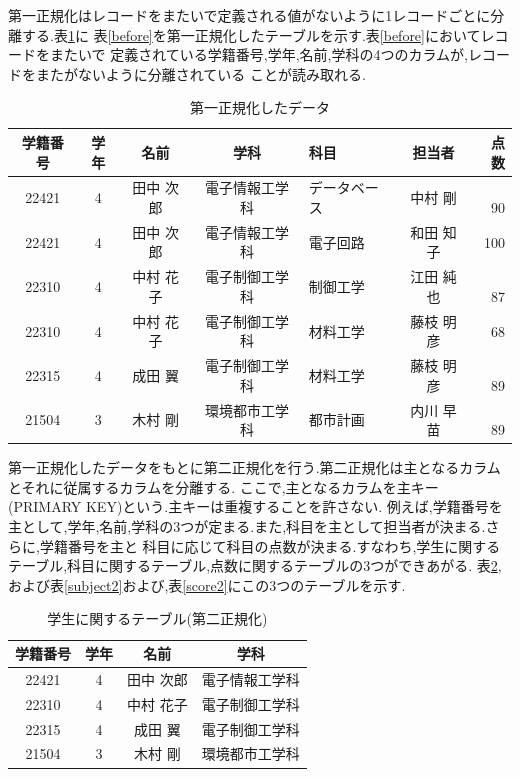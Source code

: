 \documentclass[a4j]{jarticle}
\begin{document}
        第一正規化はレコードをまたいで定義される値がないように1レコードごとに分離する.表\ref{one}に
        表\ref{before}を第一正規化したテーブルを示す.表\ref{before}においてレコードをまたいで
        定義されている学籍番号,学年,名前,学科の4つのカラムが,レコードをまたがないように分離されている
        ことが読み取れる.
        \begin{table}[H]
          \caption{第一正規化したデータ}
          \label{one}
          \begin{center}
            \begin{tabular}{c|c|c|c|l|c|r}\hline
              学籍番号 & 学年 & 名前 & 学科 & 科目 & 担当者 & 点数  \\ \hline \hline
              22421 & 4 & 田中 次郎 & 電子情報工学科 & データベース & 中村 剛 &　90  \\ \hline
              22421 & 4 & 田中 次郎 & 電子情報工学科 & 電子回路 & 和田 知子 & 100 \\ \hline
              22310 & 4 & 中村 花子 & 電子制御工学科 & 制御工学 & 江田 純也 &　87  \\ \hline
              22310 & 4 & 中村 花子 & 電子制御工学科 & 材料工学 & 藤枝 明彦 & 68 \\ \hline
              22315 & 4 & 成田 翼 & 電子制御工学科 & 材料工学 & 藤枝 明彦 &　89  \\ \hline
              21504 & 3 & 木村 剛 & 環境都市工学科 & 都市計画 & 内川 早苗 &　89  \\ \hline
             \end{tabular}
          \end{center}
          \end{table}

        第一正規化したデータをもとに第二正規化を行う.第二正規化は主となるカラムとそれに従属するカラムを分離する.
        ここで,主となるカラムを主キー(PRIMARY KEY)という.主キーは重複することを許さない.
        例えば,学籍番号を主として,学年,名前,学科の3つが定まる.また,科目を主として担当者が決まる.さらに,学籍番号を主と
        科目に応じて科目の点数が決まる.すなわち,学生に関するテーブル,科目に関するテーブル,点数に関するテーブルの3つができあがる.
        表\ref{student2},および表\ref{subject2}および,表\ref{score2}にこの3つのテーブルを示す.
        \begin{table}[H]
          \caption{学生に関するテーブル(第二正規化)}
          \label{student2}
          \begin{center}
            \begin{tabular}{c|c|c|c}\hline
              学籍番号 & 学年 & 名前 & 学科 \\ \hline \hline
              22421 & 4 & 田中 次郎 & 電子情報工学科 \\ \hline
              22310 & 4 & 中村 花子 & 電子制御工学科 \\ \hline
              22315 & 4 & 成田 翼 & 電子制御工学科 \\ \hline
              21504 & 3 & 木村 剛 & 環境都市工学科 \\ \hline
             \end{tabular}
          \end{center}
          \end{table}
\end{document}
